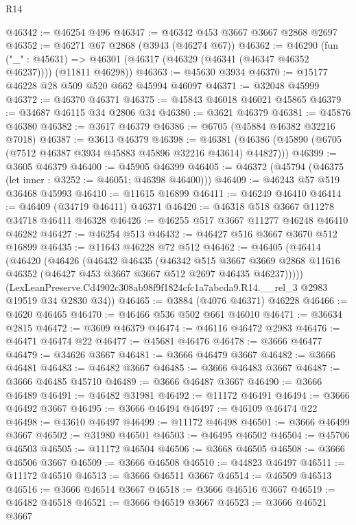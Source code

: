 \begin{lexlean}{R14}
\begin{coremodule}
@46342 := @46254 @496
@46347 := @46342 @453 @3667 @3667 @2868 @2697
@46352 := @46271 @67 @2868 (@3943 (@46274 @67))
@46362 := @46290
    (fun ("_" : @45631) => @46301 (@46317 (@46329 (@46341 (@46347 @46352 @46237)))) (@11811 @46298))
@46363 := @45630 @3934
@46370 := @15177 @46228 @28 @509 @520 @662 @45994 @46097
@46371 := @32048 @45999
@46372 := @46370 @46371
@46375 := @45843 @46018 @46021 @45865
@46379 := @34687 @46115 @34 @2806 @34
@46380 := @3621 @46379
@46381 := @45876 @46380
@46382 := @3617 @46379
@46386 := @6705 (@45884 @46382 @32216 @7018)
@46387 := @3613 @46379
@46398 := @46381 (@46386 (@45890 (@6705 (@7512 @46387 @3934 @45883 @45896 @32216 @43614) @44827)))
@46399 := @3605 @46379
@46400 := @45905 @46399
@46405 := @46372 (@45794 (@46375 (let inner : @3252 := @46051; @46398 @46400)))
@46409 := @46243 @57 @519 @36468 @45993
@46410 := @11615 @16899
@46411 := @46249 @46410
@46414 := @46409 (@34719 @46411) @46371
@46420 := @46318 @518 @3667 @11278 @34718 @46411 @46328
@46426 := @46255 @517 @3667 @11277 @46248 @46410 @46282
@46427 := @46254 @513
@46432 := @46427 @516 @3667 @3670 @512 @16899
@46435 := @11643 @46228 @72 @512
@46462 := @46405
    (@46414
      (@46420
        (@46426
          (@46432
            @46435
            (@46342
              @515
              @3667
              @3669
              @2868
              @11616
              @46352
              (@46427 @453 @3667 @3667 @512 @2697 @46435 @46237)))))
      (LexLeanPreserve.Cd4902c308ab98f9f1824cfc1a7abcda9.R14.__rel_3 @2983 @19519 @34 @2830 @34))
@46465 := @3884 (@4076 @46371) @46228
@46466 := @4620 @46465
@46470 := @46466 @536 @502 @661 @46010
@46471 := @36634 @2815
@46472 := @3609 @46379
@46474 := @46116 @46472 @2983
@46476 := @46471 @46474 @22
@46477 := @45681 @46476
@46478 := @3666 @46477
@46479 := @34626 @3667
@46481 := @3666 @46479 @3667
@46482 := @3666 @46481
@46483 := @46482 @3667
@46485 := @3666 @46483 @3667
@46487 := @3666 @46485 @45710
@46489 := @3666 @46487 @3667
@46490 := @3666 @46489
@46491 := @46482 @31981
@46492 := @11172 @46491
@46494 := @3666 @46492 @3667
@46495 := @3666 @46494
@46497 := @46109 @46474 @22
@46498 := @43610 @46497
@46499 := @11172 @46498
@46501 := @3666 @46499 @3667
@46502 := @31980 @46501
@46503 := @46495 @46502
@46504 := @45706 @46503
@46505 := @11172 @46504
@46506 := @3668 @46505
@46508 := @3666 @46506 @3667
@46509 := @3666 @46508
@46510 := @44823 @46497
@46511 := @11172 @46510
@46513 := @3666 @46511 @3667
@46514 := @46509 @46513
@46516 := @3666 @46514 @3667
@46518 := @3666 @46516 @3667
@46519 := @46482 @46518
@46521 := @3666 @46519 @3667
@46523 := @3666 @46521 @3667

\end{coremodule}
\end{lexlean}
